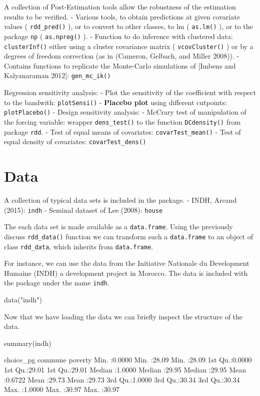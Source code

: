 \documentclass[article]{jss}
\begin{document}
A collection of Post-Estimation tools allow the robustness of the
estimation results to be verified. - Various tools, to obtain
predictions at given covariate values ( \texttt{rdd\_pred()} ), or to
convert to other classes, to lm ( \texttt{as.lm()} ), or to the package
\texttt{np} ( \texttt{as.npreg()} ). - Function to do inference with
clustered data: \texttt{clusterInf()} either using a cluster covariance
matrix ( \texttt{vcovCluster()} ) or by a degrees of freedom correction
(as in (Cameron, Gelbach, and Miller 2008)). - Contains functions to
replicate the Monte-Carlo simulations of {[}Imbens and Kalyanaraman
2012{]}: \texttt{gen\_mc\_ik()}

Regression sensitivity analysis: - Plot the sensitivity of the
coefficient with respect to the bandwith: \texttt{plotSensi()} -
\textbf{Placebo plot} using different cutpoints: \texttt{plotPlacebo()}
- Design sensitivity analysis: - McCrary test of manipulation of the
forcing variable: wrapper \texttt{dens\_test()} to the function
\texttt{DCdensity()} from package \texttt{rdd}. - Test of equal means of
covariates: \texttt{covarTest\_mean()} - Test of equal density of
covariates: \texttt{covarTest\_dens()}

\section{Data}\label{data}

A collection of typical data sets is included in the package. - INDH,
Arcand (2015): \texttt{indh} - Seminal dataset of Lee (2008):
\texttt{house}

The each data set is made available as a \texttt{data.frame}. Using the
previously discuss \texttt{rdd\_data()} function we can transform such a
\texttt{data.frame} to an object of class \texttt{rdd\_data}, which
inherits from \texttt{data.frame}.

For instance, we can use the data from the Initiative Nationale du
Development Humaine (INDH) a development project in Morocco. The data is
included with the package under the name \texttt{indh}.

\begin{CodeChunk}
\begin{CodeInput}
data("indh")
\end{CodeInput}
\end{CodeChunk}

Now that we have loading the data we can briefly inspect the structure
of the data.

\begin{CodeChunk}
\begin{CodeInput}
summary(indh)
\end{CodeInput}
\begin{CodeOutput}
   choice_pg         commune         poverty     
 Min.   :0.0000   Min.   :28.09   Min.   :28.09  
 1st Qu.:0.0000   1st Qu.:29.01   1st Qu.:29.01  
 Median :1.0000   Median :29.95   Median :29.95  
 Mean   :0.6722   Mean   :29.73   Mean   :29.73  
 3rd Qu.:1.0000   3rd Qu.:30.34   3rd Qu.:30.34  
 Max.   :1.0000   Max.   :30.97   Max.   :30.97  
\end{CodeOutput}
\end{CodeChunk}
\end{document}
